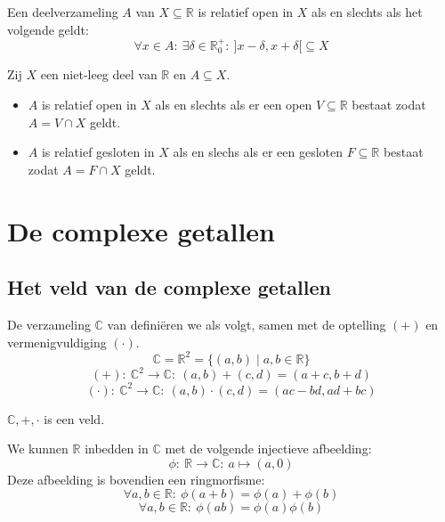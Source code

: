 \documentclass[main.tex]{subfiles}
\begin{document}
\begin{st}
  Een  deelverzameling $A$ van $X\subseteq \mathbb{R}$  is relatief open in $X$ als en slechts als het volgende geldt:
  \[ \forall x\in A:\ \exists \delta\in \mathbb{R}_{0}^{+}:\ ]x-\delta,x+\delta[ \subseteq X \]
\end{st}

\begin{pr}
  Zij $X$ een niet-leeg deel van $\mathbb{R}$ en $A \subseteq X$.
  \begin{itemize}
  \item $A$ is relatief open in $X$ als en slechts als er een open $V\subseteq \mathbb{R}$ bestaat zodat $A=V \cap X$ geldt.
  \item $A$ is relatief gesloten in $X$ als en slechs als er een gesloten $F \subseteq \mathbb{R}$ bestaat zodat $A=F \cap X$ geldt.
  \end{itemize}

\end{pr}

\section{De complexe getallen}
\label{sec:de-complexe-getallen}

\subsection{Het veld van de complexe getallen}
\label{sec:het-veld-van}



\begin{de}
  De verzameling $\mathbb{C}$ van  defini\"eren we als volgt, samen met de optelling $(+)$ en vermenigvuldiging $(\cdot)$.
  \[ \mathbb{C} = \mathbb{R}^{2} = \{ (a,b) \mid a,b\in \mathbb{R} \} \]
  \[ (+):\ \mathbb{C}^{2} \rightarrow \mathbb{C}:\ (a,b) + (c,d) = (a+c,b+d) \]
  \[ (\cdot):\ \mathbb{C}^{2} \rightarrow \mathbb{C}:\ (a,b) \cdot (c,d) = (ac-bd, ad+bc) \]
\end{de}

\begin{st}
  $\mathbb{C},+,\cdot$ is een veld.
\end{st}

\begin{pr}
  We kunnen $\mathbb{R}$ inbedden in $\mathbb{C}$ met de volgende injectieve afbeelding:
  \[ \phi:\ \mathbb{R} \rightarrow \mathbb{C}:\ a \mapsto (a,0) \]
  Deze afbeelding is bovendien een ringmorfisme:
  \[ \forall a,b \in \mathbb{R}:\ \phi(a+b) = \phi(a) + \phi(b) \]
  \[ \forall a,b \in \mathbb{R}:\ \phi(ab) = \phi(a)\phi(b) \] 
\end{pr}
\end{document}
